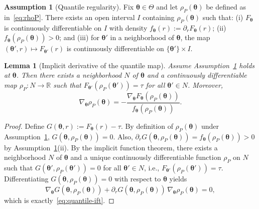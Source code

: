 \documentclass[11pt]{article}
\newcommand{\R}{\mathbb{R}}
\newcommand{\btheta}{\bm{\theta}}
\theoremstyle{plain}
\newtheorem{lemma}[theorem]{Lemma}
\theoremstyle{definition}
\newtheorem{assumption}[theorem]{Assumption}
\begin{document}
\begin{assumption}[Quantile regularity]\label{asm:quantile-reg}
Fix $\btheta\in\Theta$ and let $\rho_P(\btheta)$ be defined as in~\eqref{eq:rhoP}.
There exists an open interval $I$ containing $\rho_P(\btheta)$ such that:
(i) $F_{\btheta}$ is continuously differentiable on $I$ with density $f_{\btheta}(r):=\partial_r F_{\btheta}(r)$;
(ii) $f_{\btheta}(\rho_P(\btheta))>0$; and
(iii) for $\btheta'$ in a neighborhood of $\btheta$, the map $(\btheta',r)\mapsto F_{\btheta'}(r)$ is continuously differentiable on $\{\btheta'\}\times I$.
\end{assumption}

\begin{lemma}[Implicit derivative of the quantile map]\label{lem:quantile-derivative}
Assume Assumption~\ref{asm:quantile-reg} holds at $\btheta$.
Then there exists a neighborhood $N$ of $\btheta$ and a continuously differentiable map $\rho_P:N\to \R$ such that
$F_{\btheta'}(\rho_P(\btheta'))=\tau$ for all $\btheta'\in N$.
Moreover,
\begin{equation}\label{eq:quantile-ift}
\nabla_{\btheta}\rho_P(\btheta)
=
-\frac{\nabla_{\btheta}F_{\btheta}(\rho_P(\btheta))}{f_{\btheta}(\rho_P(\btheta))}.
\end{equation}
\end{lemma}

\begin{proof}
Define $G(\btheta,r):=F_{\btheta}(r)-\tau$.
By definition of $\rho_P(\btheta)$ under Assumption~\ref{asm:quantile-reg}, $G(\btheta,\rho_P(\btheta))=0$.
Also, $\partial_r G(\btheta,\rho_P(\btheta))=f_{\btheta}(\rho_P(\btheta))>0$ by Assumption~\ref{asm:quantile-reg}(ii).
By the implicit function theorem, there exists a neighborhood $N$ of $\btheta$ and a unique continuously differentiable function $\rho_P$ on $N$
such that $G(\btheta',\rho_P(\btheta'))=0$ for all $\btheta'\in N$, i.e., $F_{\btheta'}(\rho_P(\btheta'))=\tau$.
Differentiating $G(\btheta,\rho_P(\btheta))=0$ with respect to $\btheta$ yields
\[
\nabla_{\btheta}G(\btheta,\rho_P(\btheta)) + \partial_r G(\btheta,\rho_P(\btheta)) \,\nabla_{\btheta}\rho_P(\btheta)=0,
\]
which is exactly~\eqref{eq:quantile-ift}.
\end{proof}
\end{document}

